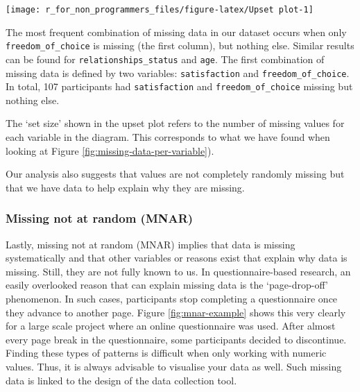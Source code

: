 \documentclass[
]{book}
\begin{document}
\begin{center}\texttt{[image: r\_for\_non\_programmers\_files/figure-latex/Upset plot-1]} \end{center}

The most frequent combination of missing data in our dataset occurs when only \texttt{freedom\_of\_choice} is missing (the first column), but nothing else. Similar results can be found for \texttt{relationships\_status} and \texttt{age}. The first combination of missing data is defined by two variables: \texttt{satisfaction} and \texttt{freedom\_of\_choice}. In total, 107 participants had \texttt{satisfaction} and \texttt{freedom\_of\_choice} missing but nothing else.

The `set size' shown in the upset plot refers to the number of missing values for each variable in the diagram. This corresponds to what we have found when looking at Figure \ref{fig:missing-data-per-variable}).

Our analysis also suggests that values are not completely randomly missing but that we have data to help explain why they are missing.

\hypertarget{missing-not-at-random-mnar}{%
\subsubsection{Missing not at random (MNAR)}\label{missing-not-at-random-mnar}}

Lastly, missing not at random (MNAR) implies that data is missing systematically and that other variables or reasons exist that explain why data is missing. Still, they are not fully known to us. In questionnaire-based research, an easily overlooked reason that can explain missing data is the `page-drop-off' phenomenon. In such cases, participants stop completing a questionnaire once they advance to another page. Figure \ref{fig:mnar-example} shows this very clearly for a large scale project where an online questionnaire was used. After almost every page break in the questionnaire, some participants decided to discontinue. Finding these types of patterns is difficult when only working with numeric values. Thus, it is always advisable to visualise your data as well. Such missing data is linked to the design of the data collection tool.
\end{document}
